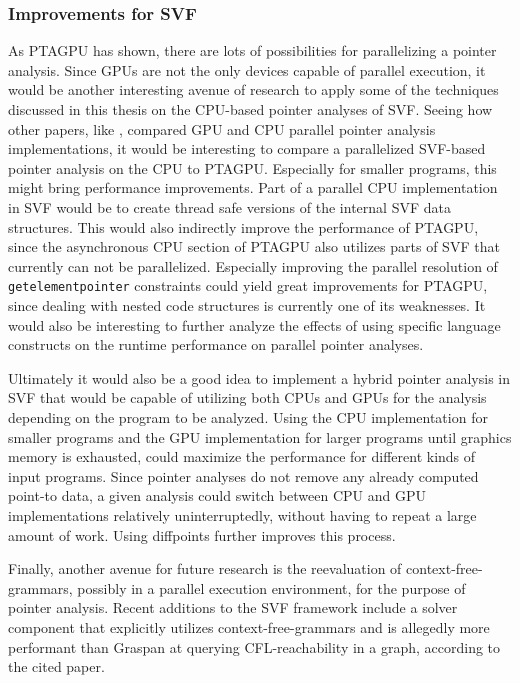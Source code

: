 \subsubsection{Improvements for SVF}
As PTAGPU has shown, there are lots of possibilities for parallelizing a pointer analysis.
Since GPUs are not the only devices capable of parallel execution, it would be another interesting avenue of research to apply some of the techniques discussed in this thesis on the CPU-based pointer analyses of SVF.
Seeing how other papers, like \cite{mendez2012gpu}, compared GPU and CPU parallel pointer analysis implementations, it would be interesting to compare a parallelized SVF-based pointer analysis on the CPU to PTAGPU. Especially for smaller programs, this might bring performance improvements.
Part of a parallel CPU implementation in SVF would be to create thread safe versions of the internal SVF data structures.
This would also indirectly improve the performance of PTAGPU, since the asynchronous CPU section of PTAGPU also utilizes parts of SVF that currently can not be parallelized.
Especially improving the parallel resolution of \verb|getelementpointer| constraints could yield great improvements for PTAGPU, since dealing with nested code structures is currently one of its weaknesses.
It would also be interesting to further analyze the effects of using specific language constructs on the runtime performance on parallel pointer analyses.

Ultimately it would also be a good idea to implement a hybrid pointer analysis in SVF that would be capable of utilizing both CPUs and GPUs for the analysis depending on the program to be analyzed.
Using the CPU implementation for smaller programs and the GPU implementation for larger programs until graphics memory is exhausted, could maximize the performance for different kinds of input programs.
Since pointer analyses do not remove any already computed point-to data, a given analysis could switch between CPU and GPU implementations relatively uninterruptedly, without having to repeat a large amount of work.
Using diffpoints further improves this process.

Finally, another avenue for future research is the reevaluation of context-free-grammars, possibly in a parallel execution environment, for the purpose of pointer analysis.
Recent additions to the SVF framework include a solver component that explicitly utilizes context-free-grammars \cite{lei2022taming} and is allegedly more performant than Graspan at querying CFL-reachability in a graph, according to the cited paper.
